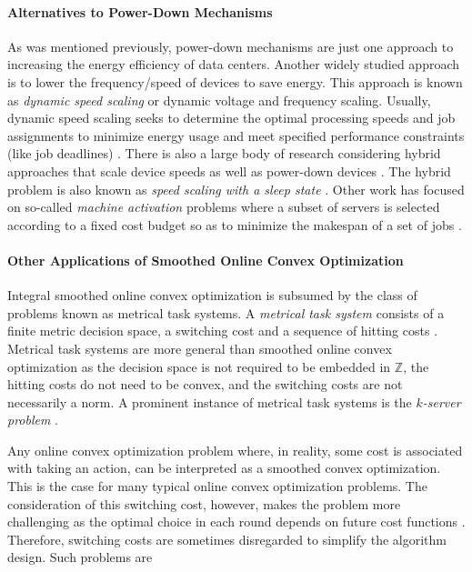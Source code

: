 \paragraph{Alternatives to Power-Down Mechanisms} As was mentioned previously, power-down mechanisms are just one approach to increasing the energy efficiency of data centers. Another widely studied approach is to lower the frequency/speed of devices to save energy. This approach is known as \emph{dynamic speed scaling} or dynamic voltage and frequency scaling. Usually, dynamic speed scaling seeks to determine the optimal processing speeds and job assignments to minimize energy usage and meet specified performance constraints (like job deadlines) \cite{Albers2007, Albers2011, Jin2016}. There is also a large body of research considering hybrid approaches that scale device speeds as well as power-down devices \cite{Jin2016}. The hybrid problem is also known as \emph{speed scaling with a sleep state} \cite{Albers2014}. Other work has focused on so-called \emph{machine activation} problems where a subset of servers is selected according to a fixed cost budget so as to minimize the makespan of a set of jobs \cite{Khuller2009, Li2011}.

\paragraph{Other Applications of Smoothed Online Convex Optimization} Integral smoothed online convex optimization is subsumed by the class of problems known as metrical task systems. A \emph{metrical task system} consists of a finite metric decision space, a switching cost and a sequence of hitting costs \cite{Bubeck2018_3}. Metrical task systems are more general than smoothed online convex optimization as the decision space is not required to be embedded in $\mathbb{Z}$, the hitting costs do not need to be convex, and the switching costs are not necessarily a norm. A prominent instance of metrical task systems is the \emph{$k$-server problem} \cite{Bubeck2017}.

Any online convex optimization problem where, in reality, some cost is associated with taking an action, can be interpreted as a smoothed convex optimization. This is the case for many typical online convex optimization problems. The consideration of this switching cost, however, makes the problem more challenging as the optimal choice in each round depends on future cost functions \cite{Chen2015}. Therefore, switching costs are sometimes disregarded to simplify the algorithm design. Such problems are

